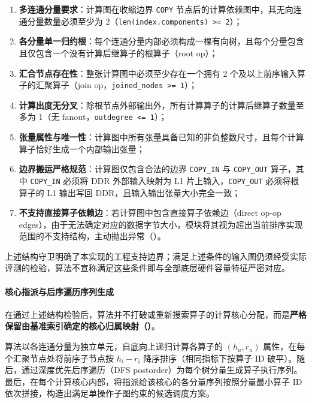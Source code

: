 \documentclass[anonymous,withtoc]{gmcm2026}
\providecommand{\tightlist}{\setlength{\itemsep}{0pt}\setlength{\parskip}{0pt}}
\begin{document}
\begin{enumerate}
\def\labelenumi{\arabic{enumi}.}
\tightlist
\item
  \textbf{多连通分量要求}：计算图在收缩边界 \texttt{COPY} 节点后的计算依赖图中，其无向连通分量数量必须至少为 2（\texttt{len(index.components)\ \textgreater{}=\ 2}）；
\item
  \textbf{各分量单一归约根}：每个连通分量内部必须构成一棵有向树，且每个分量包含且仅包含一个没有计算后继算子的根算子（root op）；
\item
  \textbf{汇合节点存在性}：整张计算图中必须至少存在一个拥有 2 个及以上前序输入算子的汇聚算子（join op，\texttt{joined\_nodes\ \textgreater{}=\ 1}）；
\item
  \textbf{计算出度无分叉}：除根节点外部输出外，所有计算算子的计算后继算子数量至多为 1（无 fanout，\texttt{outdegree\ \textless{}=\ 1}）；
\item
  \textbf{张量属性与唯一性}：计算图中所有张量具备已知的非负整数尺寸，且每个计算算子恰好生成一个内部输出张量；
\item
  \textbf{边界搬运严格规范}：计算图仅包含合法的边界 \texttt{COPY\_IN} 与 \texttt{COPY\_OUT} 算子，其中 \texttt{COPY\_IN} 必须将 DDR 外部输入映射为 L1 片上输入，\texttt{COPY\_OUT} 必须将根算子的 L1 输出写回 DDR，且输入输出张量大小完全一致；
\item
  \textbf{不支持直接算子依赖边}：若计算图中包含直接算子依赖边（direct op-op edges），由于无法确定对应的数据字节大小，模块将其视为超出当前排序实现范围的不支持结构，主动抛出异常（\texttt{}）。
\end{enumerate}

上述结构守卫明确了本实现的工程支持边界；满足上述条件的输入图仍须经受实际评测的检验，算法不宣称满足这些条件即与全部底层硬件容量特征严密对应。

\paragraph{核心指派与后序遍历序列生成}

在通过上述结构检验后，算法并不打破或重新搜索算子的计算核心分配，而是\textbf{严格保留由基准索引确定的核心归属映射（\texttt{}）}。

算法以各连通分量为独立单元，自底向上递归计算各算子的 \((h_u, r_u)\) 属性，在每个汇聚节点处将前序子节点按 \(h_i - r_i\) 降序排序（相同指标下按算子 ID 破平）。随后，通过深度优先后序遍历（DFS postorder）为每个树分量生成算子执行序列。最后，在每个计算核心内部，将指派给该核心的各分量序列按照分量最小算子 ID 依次拼接，构造出满足单操作子图约束的候选调度方案。
\end{document}
